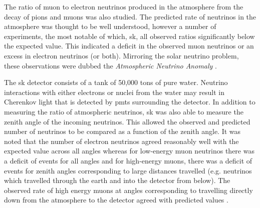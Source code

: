 The ratio of muon to electron neutrinos produced in the atmosphere from the decay of pions and muons was also studied. The predicted rate of neutrinos in the atmosphere was thought to be well understood, however a number of experiments, the most notable of which, \Gls{sk}, all observed ratios significantly below the expected value. This indicated a deficit in the observed muon neutrinos or an excess in electron neutrinos (or both). Mirroring the solar neutrino problem, these observations were dubbed the \textit{Atmospheric Neutrino Anomaly} \cite{Atmospheric_anomaly}.

The \gls{sk} detector consists of a tank of 50,000 tons of pure water. Neutrino interactions with either electrons or nuclei from the water may result in Cherenkov light that is detected by \glspl{pmt} surrounding the detector. In addition to measuring the ratio of atmospheric neutrinos, \Gls{sk} was also able to measure the zenith angle of the incoming neutrinos. This allowed the observed and predicted number of neutrinos to be compared as a function of the zenith angle. It was noted that the number of electron neutrinos agreed reasonably well with the expected value across all angles whereas for low-energy muon neutrinos there was a deficit of events for all angles and for high-energy muons, there was a deficit of events for zenith angles corresponding to large distances travelled (e.g. neutrinos which travelled through the earth and into the detector from below). The observed rate of high energy muons at angles corresponding to travelling directly down from the atmosphere to the detector agreed with predicted values \cite{SuperK_neutrino_oscillations}. 

